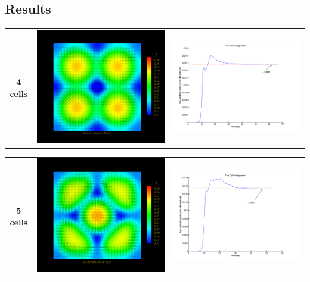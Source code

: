 \documentclass[compress,12pt]{beamer}
\begin{document}
\subsection{Results}
\begin{frame}
  \begin{center}
  \begin{tabular}{ccc} \\
    \textbf{4 cells} &
    \includegraphics[width=.3\textwidth]{figures/4cell} &
    \includegraphics[width=.3\textwidth]{figures/4cell_max_w} \\
  \end{tabular}
 \begin{tabular}{ccc} \\
   \textbf{5 cells} &
   \includegraphics[width=.3\textwidth]{figures/5cell} &
   \includegraphics[width=.3\textwidth]{figures/5cell_max_w} \\
 \end{tabular}
  \end{center}
\end{frame}
\end{document}
